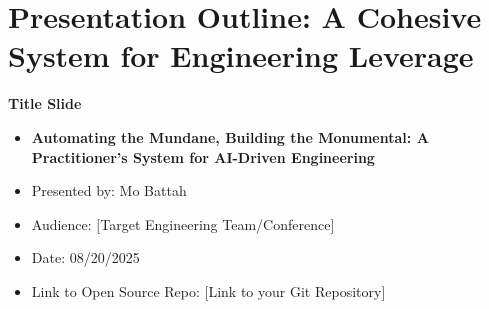 \documentclass[
  ignorenonframetext,
  aspectratio=169,
]{beamer}
\author{}
\date{}
\providecommand{\tightlist}{%
  \setlength{\itemsep}{0pt}\setlength{\parskip}{0pt}}
\begin{document}
\section{\texorpdfstring{\textbf{Presentation Outline: A Cohesive System
for Engineering
Leverage}}{Presentation Outline: A Cohesive System for Engineering Leverage}}\label{presentation-outline-a-cohesive-system-for-engineering-leverage}

\begin{frame}{\textbf{Title Slide}}
\label{title-slide}
\begin{itemize}
\tightlist
\item
  \textbf{Automating the Mundane, Building the Monumental: A
  Practitioner's System for AI-Driven Engineering}\\
\item
  Presented by: Mo Battah\\
\item
  Audience: {[}Target Engineering Team/Conference{]}\\
\item
  Date: 08/20/2025\\
\item
  Link to Open Source Repo: {[}Link to your Git Repository{]}
\end{itemize}
\end{frame}
\end{document}
